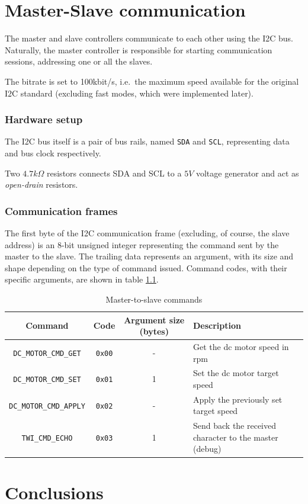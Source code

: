 \documentclass[binding=0.6cm,Lau]{sapthesis}
\begin{document}
\chapter{Master-Slave communication}
\label{ch:master-slave-comm}
The master and slave controllers communicate to each other using the I2C
bus. Naturally, the master controller is responsible for starting communication
sessions, addressing one or all the slaves.

The bitrate is set to 100kbit/s, i.e.\ the maximum speed available for the
original I2C standard\cite{i2c-ref} (excluding fast modes, which were
implemented later).

\subsection{Hardware setup}
The I2C bus itself is a pair of bus rails, named \texttt{SDA} and \texttt{SCL},
representing data and bus clock respectively.

Two $4.7 k\Omega$ resistors connects SDA and SCL to a $5V$ voltage generator
and act as \emph{open-drain} resistors.

\subsection{Communication frames}
The first byte of the I2C communication frame (excluding, of course, the slave
address) is an 8-bit unsigned integer representing the command sent by the
master to the slave. The trailing data represents an argument, with its size
and shape depending on the type of command issued. Command codes, with their
specific arguments, are shown in table \ref{tab:i2c-commands}.

\begin{table}[bh]
  \begin{tabularx}{\textwidth}{c c c X}
    \toprule
    Command & Code & Argument size (bytes) & Description \\
    \midrule
      \texttt{DC\_MOTOR\_CMD\_GET}   & \texttt{0x00} & - & Get the dc motor speed in rpm \\
      \texttt{DC\_MOTOR\_CMD\_SET}   & \texttt{0x01} & 1 & Set the dc motor target speed \\
      \texttt{DC\_MOTOR\_CMD\_APPLY} & \texttt{0x02} & - & Apply the previously set target speed \\
      \texttt{TWI\_CMD\_ECHO}        & \texttt{0x03} & 1 & Send back the received character to the master (debug)\\
    \bottomrule
  \end{tabularx}
  \caption{Master-to-slave commands}
  \label{tab:i2c-commands}
\end{table}


\chapter{Conclusions}
\label{ch:conclusions}


\backmatter
\cleardoublepage
{} %



\end{document}
